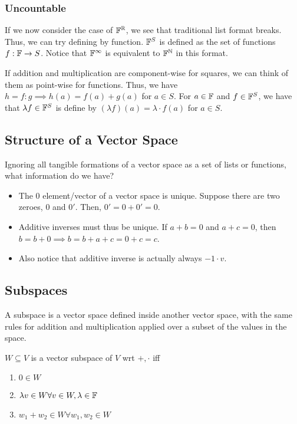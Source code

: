 \documentclass{book}
\begin{document}
\subsubsection{Uncountable}
If we now consider the case of $\mathbb{F}^{\mathbb{R}}$, we see that traditional list format breaks. Thus, we can try defining by function. $\mathbb{F}^S$ is defined as the set of functions $f : \mathbb{F} \to S$. Notice that $\mathbb{F}^\infty$ is equivalent to $\mathbb{F}^{\mathbb{N}}$ in this format.

If addition and multiplication are component-wise for squares, we can think of them as point-wise for functions. Thus, we have $h = f:g \implies h(a) = f(a) + g(a)$ for $a \in S$. For $a \in \mathbb{F}$ and $f \in \mathbb{F}^S$, we have that $\lambda f \in \mathbb{F}^S$ is define by $(\lambda f)(a) = \lambda \cdot f(a)$ for $a \in S$. 

\subsection{Structure of a Vector Space}
Ignoring all tangible formations of a vector space as a set of lists or functions, what information do we have?

\begin{itemize}
	\item The 0 element/vector of a vector space is unique. Suppose there are two zeroes, $0$ and $0'$. Then, $0' = 0 + 0' = 0$.
	\item Additive inverses must thus be unique. If $a + b = 0$ and $a + c = 0$, then $b = b + 0 \implies b = b + a + c = 0 + c = c$.
	\item Also notice that additive inverse is actually always $-1 \cdot v$. 
\end{itemize}

\subsection{Subspaces}
A subspace is a vector space defined inside another vector space, with the same rules for addition and multiplication applied over a subset of the values in the space.

\begin{theorem}
	$W \subseteq V$ is a vector subspace of $V$ wrt $+, \cdot$ iff
	\begin{enumerate}[label=\alph*)]
		\item $0 \in W$
		\item $\lambda v \in W \forall v \in W, \lambda \in \mathbb{F}$
		\item $w_1 + w_2 \in W \forall w_1, w_2 \in W$
	\end{enumerate}
\end{theorem}
\end{document}
